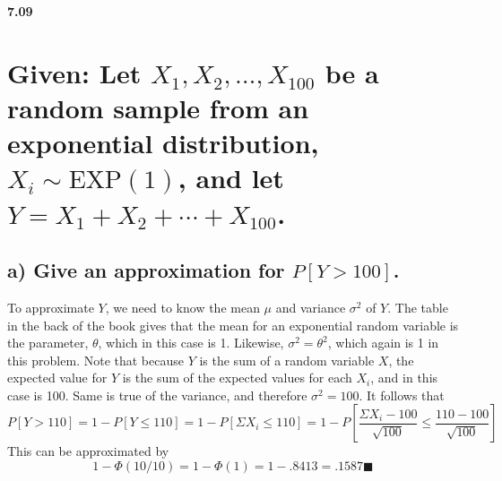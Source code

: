 {\bf 7.09}

\section*{Given: Let $X_1, X_2, \ldots, X_{100}$ be a random sample from an exponential distribution, $X_i \sim \text{EXP}(1)$, and let $Y = X_1 + X_2 + \cdots + X_{100}$.}
\subsection*{a) Give an approximation for $P[Y > 100]$.}
To approximate $Y$, we need to know the mean $\mu$ and variance $\sigma^2$ of $Y$. The table in the back of the book gives that the mean for an exponential random variable is the parameter, $\theta$, which in this case is 1. Likewise, $\sigma^2 = \theta^2$, which again is 1 in this problem. Note that because $Y$ is the sum of a random variable $X$, the expected value for $Y$ is the sum of the expected values for each $X_i$, and in this case is 100. Same is true of the variance, and therefore $\sigma^2 = 100$. It follows that 
$$P[Y > 110] = 1 - P[Y \leq 110] = 1 - P[\Sigma X_i \leq 110] = 1 - P[\frac{\Sigma X_i - 100}{\sqrt{100}} \leq \frac{110 - 100}{\sqrt{100}}]$$
This can be approximated by $$1 - \Phi (10/10) = 1 - \Phi(1) = 1 - .8413 = .1587 \blacksquare$$
